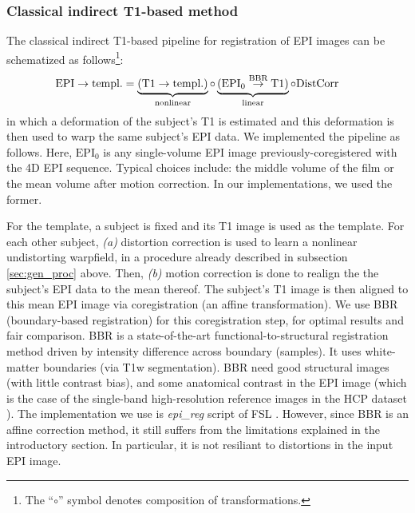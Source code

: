 \subsubsection{Classical indirect T1-based method}
\label{sec:classical}
The classical indirect T1-based pipeline for registration of EPI images can be schematized as
follows\footnote{The ``$\circ$'' symbol denotes composition of transformations.}:
\begin{eqnarray}
  \begin{split}
    \hspace{-1.8em}\text{EPI} \rightarrow \text{templ.} =
    \underbrace{(\text{T1} \rightarrow \text{templ.})}_{\text{nonlinear}} \circ \underbrace{(\text{EPI}_0
      \overset{\text{BBR}}{\rightarrow} \text{T1})}_{\text{linear}} \circ \text{DistCorr}
    \end{split}
  \label{eq:dct1_pl}
\end{eqnarray}
in which a deformation of the subject's T1 is
estimated and this deformation is then used to warp the same subject's
EPI data. We implemented the pipeline as follows. Here, $\text{EPI}_0$ is any single-volume EPI
image previously-coregistered with the 4D EPI sequence. Typical choices include: the middle
volume of the film or the mean volume after motion correction. In our implementations, we used the
former.

 For the template, a subject is fixed
and its T1 image is used as the template. For each other subject,
\textit{(a)} distortion correction is used to learn a nonlinear
    undistorting warpfield, in a procedure already described in
    subsection \ref{sec:gen_proc} above. Then,
\textit{(b)} motion correction is done to realign the the
subject's EPI data to the mean thereof.
    The subject's T1 image is then aligned to this
    mean EPI image via coregistration (an affine transformation).
We use BBR (boundary-based registration)
    \cite{greve2009accurate} for this coregistration step,
    for optimal results and fair comparison.
    BBR is a state-of-the-art functional-to-structural registration method driven by intensity
    difference across boundary (samples). It uses white-matter boundaries (via T1w segmentation).
    BBR need good structural images
    (with little contrast bias), and some anatomical contrast in the EPI image (which
    is the case of the single-band high-resolution reference images in the HCP dataset
    \cite{VanEssen20122222}). The implementation we use is \textit{epi\_reg} script of FSL
    \cite{smith2004}.
    However, since BBR is an affine correction method, it still suffers from the limitations explained in
    the introductory section. In particular, it is not resiliant to distortions in the input EPI
    image.
    
